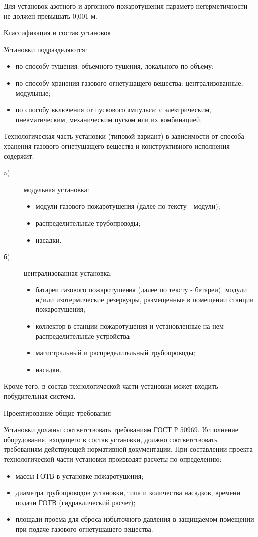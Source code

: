 Для установок азотного и аргонного пожаротушения параметр негерметичности не должен превышать 0,001 м.

Классификация и состав установок

Установки подразделяются:
\begin{itemize}
\item по способу тушения: объемного тушения, локального по объему;
\item по способу хранения газового огнетушащего вещества: централизованные, модульные;
\item по способу включения от пускового импульса: с электрическим, пневматическим, механическим пуском или их комбинацией.
\end{itemize}

Технологическая часть установки (типовой вариант) в зависимости от способа хранения газового огнетушащего вещества и конструктивного
исполнения содержит:
\begin{description}
\item[a)] модульная установка:
	\begin{itemize}
	\item модули газового пожаротушения (далее по тексту - модули);
	\item распределительные трубопроводы;
	\item насадки.
	\end{itemize}
\item[б)] централизованная установка:
	\begin{itemize}
	\item батареи газового пожаротушения (далее по тексту - батареи), модули и/или изотермические резервуары, размещенные в помещении станции пожаротушения;
	\item коллектор в станции пожаротушения и установленные на нем распределительные устройства;
	\item магистральный и распределительный трубопроводы;
	\item насадки.
	\end{itemize}
\end{description}
Кроме того, в состав технологической части установки может входить побудительная система.

Проектирование-общие требования

Установки должны соответствовать требованиям ГОСТ Р 50969. Исполнение оборудования, входящего в состав установки, должно
соответствовать требованиям действующей нормативной документации. При составлении проекта технологической части установки
производят расчеты по определению:
\begin{itemize}
\item массы ГОТВ в установке пожаротушения;
\item диаметра трубопроводов установки, типа и количества насадков, времени подачи ГОТВ (гидравлический расчет);
\item площади проема для сброса избыточного давления в защищаемом помещении при подаче газового огнетушащего вещества.
\end{itemize}


